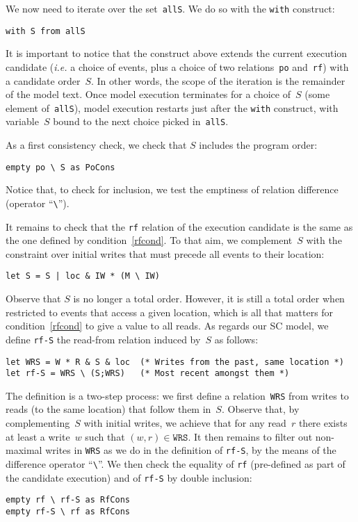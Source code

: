 \label{intro:with}We now need to iterate over the set~\verb+allS+.
We do so with the \verb+with+ construct:
\begin{verbatim}
with S from allS
\end{verbatim}
It is important to notice that the construct above extends the current
execution candidate (\emph{i.e.} a choice of events, plus a choice of
two relations~\texttt{po} and~\texttt{rf}) with a candidate order~$S$.
In other words, the scope of the iteration is the remainder of the model text.
Once model execution terminates for a choice of~$S$
(some element of~\texttt{allS}), model execution restarts just
after the \texttt{with} construct, with variable~$S$ bound to
the next choice picked in~\texttt{allS}.

As a first consistency check, we check that $S$ includes the program order:
\begin{verbatim}
empty po \ S as PoCons
\end{verbatim}
Notice that, to check for inclusion, we test the emptiness of relation
difference (operator ``\verb+\+'').


It remains to check that the \texttt{rf} relation of the execution candidate
is the same as the one defined by condition~\ref{rfcond}.
To that aim, we complement~$S$ with the constraint over initial
writes that  must precede all events to their location:
\begin{verbatim}
let S = S | loc & IW * (M \ IW)
\end{verbatim}
Observe that $S$ is no longer a total order. However, it is still a total
order when restricted to events that access a given location,
which is all that matters for condition~\ref{rfcond} to give a value
to all reads. As regards our SC model, we define \texttt{rf-S}
the read-from relation induced by~$S$ as follows:
\begin{verbatim}
let WRS = W * R & S & loc  (* Writes from the past, same location *)
let rf-S = WRS \ (S;WRS)   (* Most recent amongst them *)
\end{verbatim}
The definition is a two-step process: we first define
a relation~\texttt{WRS} from writes to reads (to the same location)
that follow them in~$S$. Observe that,
by complementing~$S$ with initial writes, we achieve that for any read~$r$
there exists at least a write~$w$ such that $(w,r) \in \texttt{WRS}$.
It then remains to filter out non-maximal writes in \texttt{WRS}
as we do in the definition of \texttt{rf-S}, by the means of
the difference operator ``\verb+\+''.
We then check the equality of \texttt{rf} (pre-defined as part of the candidate
execution) and of \texttt{rf-S} by double inclusion:
\begin{verbatim}
empty rf \ rf-S as RfCons
empty rf-S \ rf as RfCons
\end{verbatim}

